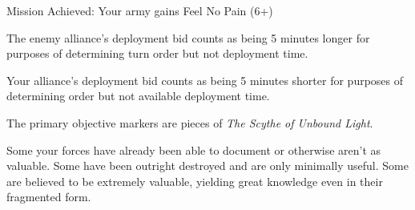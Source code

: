 Mission Achieved:
  Your army gains Feel No Pain (6+)



  The enemy alliance's deployment bid counts as being 5 minutes longer
  for purposes of determining turn order but not deployment time.

  Your alliance's deployment bid counts as being 5 minutes shorter for
  purposes of determining order but not available deployment time.


The primary objective markers are pieces of \emph{The Scythe of Unbound Light}.

Some your forces have already been able to document or otherwise
aren't as valuable.  Some have been outright destroyed and are only
minimally useful.  Some are believed to be extremely valuable,
yielding great knowledge even in their fragmented form.
